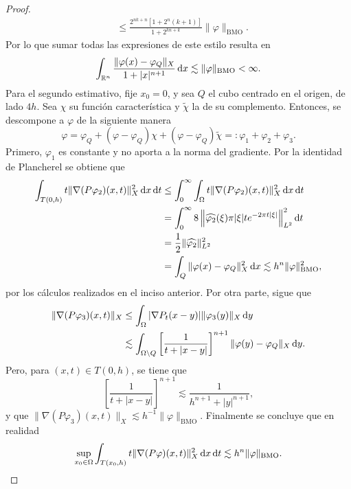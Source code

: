 \begin{proof}
\begin{align*}
		& \leq \frac{2^{nk+n} [1+2^n(k+1)]}{1+2^{kn+k}}\|\varphi\|_{\mathrm{BMO}}.
	\end{align*}
	Por lo que sumar todas las expresiones de este estilo resulta en 
	\begin{equation*}
		\int_{\mathbb{R}^n} \frac{\|\varphi(x)-\varphi_Q\|_X}{1+|x|^{n+1}} \mathop{}\!\mathrm{d} x \lesssim \|\varphi\|_{\mathrm{BMO}} < \infty.
	\end{equation*}
	Para el segundo estimativo, fije $x_0=0$, y sea $Q$ el cubo centrado en el origen, de lado $4h$. Sea $\chi$ su función característica y $\tilde{\chi}$ la de su complemento. Entonces, se descompone a $\varphi$ de la siguiente manera
	\begin{equation*}
		\varphi = \varphi_Q + (\varphi - \varphi_Q)\chi + (\varphi - \varphi_Q)\tilde{\chi} =: \varphi_1 + \varphi_2 + \varphi_3.
	\end{equation*}
	Primero, $\varphi_1$ es constante y no aporta a la norma del gradiente. Por la identidad de Plancherel se obtiene que 
	\begin{align*}
		\int_{T(0, h)} t\|\nabla (P\varphi_2)(x, t)\|_X^2 \mathop{}\!\mathrm{d} x \mathop{}\!\mathrm{d} t & \leq \int_0^\infty \int_{\Omega} t\|\nabla (P\varphi_2)(x, t)\|_X^2 \mathop{}\!\mathrm{d} x \mathop{}\!\mathrm{d} t  \\
		& = \int_0^\infty 8\left\|\widehat{\varphi_2}(\xi) \pi|\xi|  te^{-2\pi t|\xi|}\right\|_{L^2}^2 \mathop{}\!\mathrm{d} t \\
		& = \frac{1}{2} \|\widehat{\varphi_2}\|_{L^2}^2 \\
		& = \int_Q \|\varphi(x) - \varphi_Q\|_X^2 \mathop{}\!\mathrm{d} x \lesssim h^n \|\varphi\|_{\mathrm{BMO}}^2,
	\end{align*}
	por los cálculos realizados en el inciso anterior. Por otra parte, sigue que
	\begin{align*}
		\|\nabla(P\varphi_3)(x, t)\|_X & \leq \int_{\Omega} |\nabla P_t(x-y)|\|\varphi_3(y)\|_X\mathop{}\!\mathrm{d} y \\
		& \lesssim \int_{\Omega\setminus Q} \left[ \frac{1}{t+|x-y|}
		\right]^{n+1} \|\varphi(y) - \varphi_Q\|_X\mathop{}\!\mathrm{d} y.
	\end{align*}
	Pero, para $(x, t) \in T(0, h)$, se tiene que
	\begin{equation*}
		\left[ \frac{1}{t+|x-y|}
		\right]^{n+1} \lesssim \frac{1}{h^{n+1} + |y|^{n+1}},
	\end{equation*}
	y que $\|\nabla (P\varphi_3)(x, t)\|_X \lesssim h^{-1}\|\varphi\|_{\mathrm{BMO}}$. Finalmente se concluye que en realidad
	\begin{equation*}
		\sup_{x_0\in\Omega}\int_{T(x_0, h)} t\|\nabla (P\varphi)(x, t)\|_X^2\diff x \diff t \lesssim h^n\|\varphi\|_{\mathrm{BMO}}.

\end{equation*}
\end{proof}

